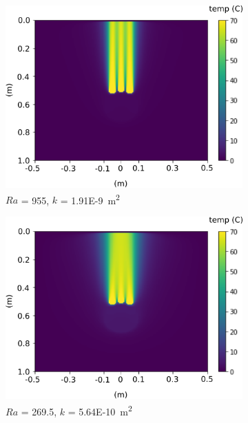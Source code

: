 \documentclass[Journal,letterpaper,InsideFigs]{ascelike-new}
\begin{document}
\begin{figure}
 \centering
 \begin{subfigure}[b]{0.49\textwidth}
    \includegraphics[width=\textwidth]{figs/ra/955.png}
    \caption{$Ra$ = 955, $k$ = \SI{1.91E-9}{\meter\squared}}
 \end{subfigure}
 \begin{subfigure}[b]{0.49\textwidth}
    \includegraphics[width=\textwidth]{figs/ra/269.png}
    \caption{$Ra$ = 269.5, $k$ = \SI{5.64E-10}{\meter\squared}}
 \end{subfigure}\\
 \begin{subfigure}[b]{0.49\textwidth}

\end{subfigure}
\end{figure}
\end{document}
